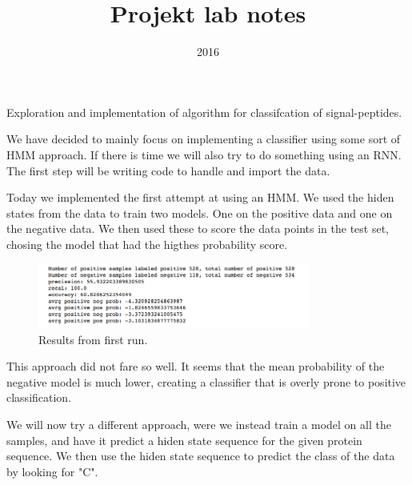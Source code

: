 \documentclass[a4paper]{tufte-handout}
\title{Projekt lab notes}
\date{2016}
\begin{document}
\maketitle


\begin{projects}
	\begin{description}
		\item Exploration and implementation of algorithm for classifcation of 
            signal-peptides.
    \end{description}
\end{projects}


We have decided to mainly focus on implementing a classifier using some sort of HMM approach. 
If there is time we will also try to do something using an RNN. The first step will be writing code to handle and import the data.



Today we implemented the first attempt at using an HMM. We used the hiden states from the data to train two models. One on the positive data and one on the negative data. We then used these to score the data points in the test set, chosing the model that had the higthes probability score. 

\begin{figure}
    \begin{center}
      \includegraphics[width=0.8\textwidth]{pics/HMM_old.png}
    \end{center}
    \caption{Results from first run.}
\end{figure}

This approach did not fare so well. It seems that the mean probability of the negative model is much lower, creating a classifier that is overly prone to positive classification.

We will now try a different approach, were we instead train a model on all the samples, and have it predict a hiden state sequence for the given protein sequence. We then use the hiden state sequence to predict the class of the data by looking for "C".
\end{document}

